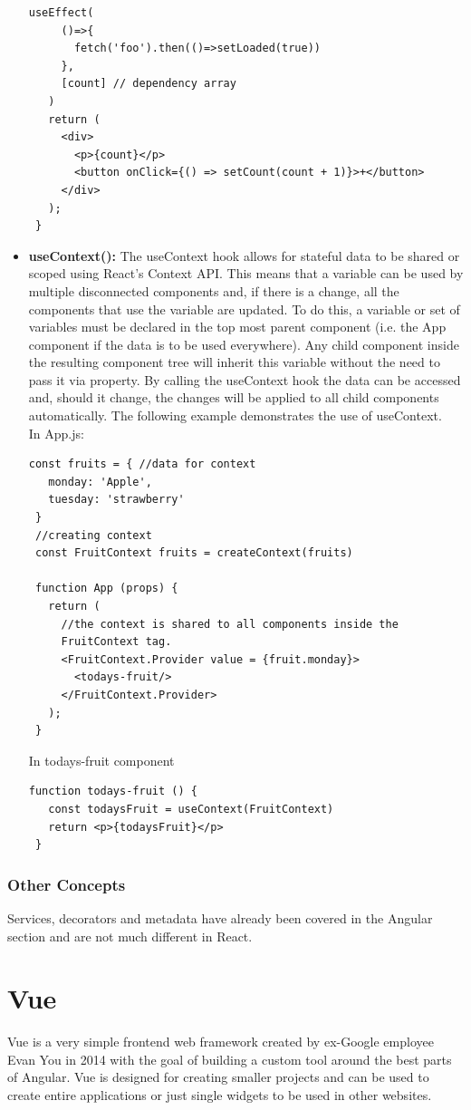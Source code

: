\begin{itemize}
\begin{Verbatim}[frame=single]
   useEffect(
     ()=>{
       fetch('foo').then(()=>setLoaded(true))
     },
     [count] // dependency array
   )
   return (
     <div>
       <p>{count}</p>		            
       <button onClick={() => setCount(count + 1)}>+</button>
     </div>
   );
 }
\end{Verbatim}
\pagebreak
\item \textbf{useContext():} The useContext hook allows for stateful data to be shared or scoped using React's Context API. This means that a variable can be used by multiple disconnected components and, if there is a change, all the components that use the variable are updated. To do this, a variable or set of variables must be declared in the top most parent component (i.e. the App component if the data is to be used everywhere). Any child component inside the resulting component tree will inherit this variable without the need to pass it via property. By calling the useContext hook the data can be accessed and, should it change, the changes will be applied to all child components automatically. The following example demonstrates the use of useContext.\\[0.5cm]
In App.js:
\begin{Verbatim}[frame=single]
 const fruits = { //data for context
   monday: 'Apple',
   tuesday: 'strawberry'
 }
 //creating context
 const FruitContext fruits = createContext(fruits)

 function App (props) {
   return (
     //the context is shared to all components inside the
     FruitContext tag.
     <FruitContext.Provider value = {fruit.monday}>
       <todays-fruit/>
     </FruitContext.Provider>
   );  
 }
\end{Verbatim}
In todays-fruit component
\begin{Verbatim}[frame=single]
 function todays-fruit () {
   const todaysFruit = useContext(FruitContext)
   return <p>{todaysFruit}</p>
 }
\end{Verbatim}
\end{itemize}

\subsubsection{Other Concepts}
Services, decorators and metadata have already been covered in the Angular section and are not much different in React.
\section{Vue}
Vue is a very simple frontend web framework created by ex-Google employee Evan You in 2014 with the goal of building a custom tool around the best parts of Angular. Vue is designed for creating smaller projects and can be used to create entire applications or just single widgets to be used in other websites.

